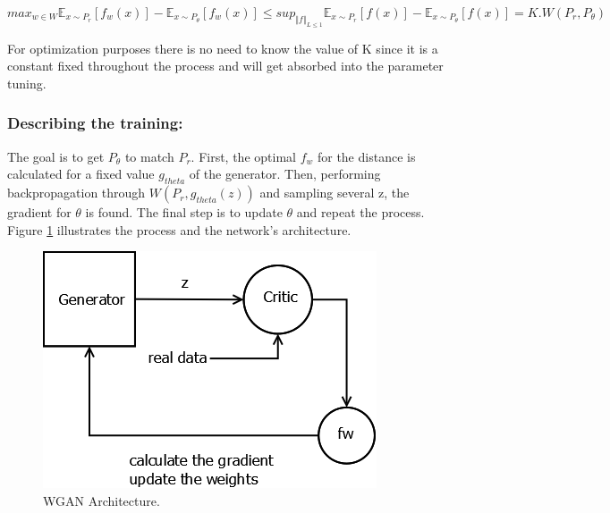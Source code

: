 \begin{center}
	$ max_{w \in W} \mathbb{E}_{x \sim P_{r}}[f_{w}(x)] - \mathbb{E}_{x \sim P_{\theta}}[f_{w}(x)] \leq sup_{\Vert f \Vert_{L \leq 1}} \mathbb{E}_{x \sim P_{r}}[f(x)] - \mathbb{E}_{x \sim P_{\theta}}[f(x)] = K . W(P_{r}, P_{\theta}) $
\end{center}

For optimization purposes there is no need to know the value of K since it is a constant fixed throughout the process and will get absorbed into the parameter tuning.
\subsubsection {Describing the training:}

The goal is to get $P_{\theta}$ to match $P_{r}$. First, the optimal $f_{w}$ for the distance is calculated for a fixed value $g_{theta}$ of the generator. Then,  performing  backpropagation through $W(P_{r}, g_{theta}(z))$ and sampling several z, the gradient for $\theta$ is found. The final step is to update $\theta$ and repeat the process. Figure \ref{fig:wgan} illustrates the process and the network's architecture. 

\begin{figure}[h!]
	\centering
	\includegraphics[scale=0.4]{media/WGAN.png}
	\caption{WGAN Architecture.} 
	\label{fig:wgan}
\end{figure}

